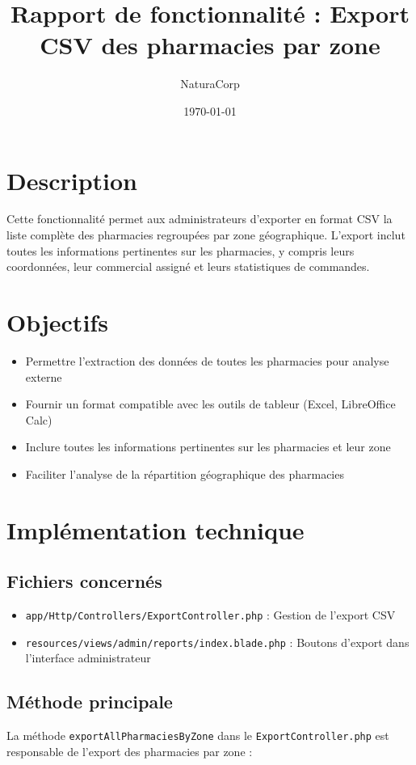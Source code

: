 \documentclass[12pt,a4paper]{article}
\title{Rapport de fonctionnalité : Export CSV des pharmacies par zone}
\author{NaturaCorp}
\date{\today}
\begin{document}
\maketitle

\section{Description}
Cette fonctionnalité permet aux administrateurs d'exporter en format CSV la liste complète des pharmacies regroupées par zone géographique. L'export inclut toutes les informations pertinentes sur les pharmacies, y compris leurs coordonnées, leur commercial assigné et leurs statistiques de commandes.

\section{Objectifs}
\begin{itemize}
    \item Permettre l'extraction des données de toutes les pharmacies pour analyse externe
    \item Fournir un format compatible avec les outils de tableur (Excel, LibreOffice Calc)
    \item Inclure toutes les informations pertinentes sur les pharmacies et leur zone
    \item Faciliter l'analyse de la répartition géographique des pharmacies
\end{itemize}

\section{Implémentation technique}

\subsection{Fichiers concernés}
\begin{itemize}
    \item \texttt{app/Http/Controllers/ExportController.php} : Gestion de l'export CSV
    \item \texttt{resources/views/admin/reports/index.blade.php} : Boutons d'export dans l'interface administrateur
\end{itemize}

\subsection{Méthode principale}
La méthode \texttt{exportAllPharmaciesByZone} dans le \texttt{ExportController.php} est responsable de l'export des pharmacies par zone :
\end{document}
